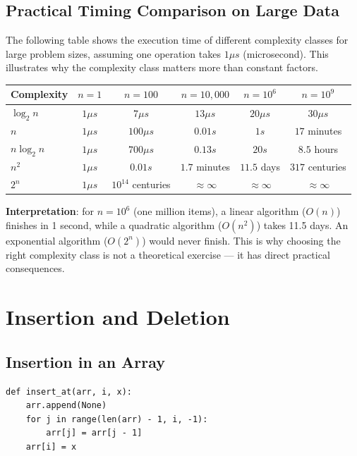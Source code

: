 \documentclass[11pt,a4paper]{article}
\begin{document}
\subsection{Practical Timing Comparison on Large Data}

The following table shows the execution time of different complexity classes for large problem sizes, assuming one operation takes $1 \mu s$ (microsecond). This illustrates why the complexity class matters more than constant factors.

\begin{center}
\begin{tabular}{l|ccccc}
\toprule
Complexity & $n=1$ & $n=100$ & $n=10{,}000$ & $n=10^6$ & $n=10^9$ \\
\midrule
$\log_2 n$ & $1 \mu s$ & $7 \mu s$ & $13 \mu s$ & $20 \mu s$ & $30 \mu s$ \\
$n$ & $1 \mu s$ & $100 \mu s$ & $0.01 s$ & $1 s$ & $17$ minutes \\
$n \log_2 n$ & $1 \mu s$ & $700 \mu s$ & $0.13 s$ & $20 s$ & $8.5$ hours \\
$n^2$ & $1 \mu s$ & $0.01 s$ & $1.7$ minutes & $11.5$ days & $317$ centuries \\
$2^n$ & $1 \mu s$ & $10^{14}$ centuries & $\approx \infty$ & $\approx \infty$ & $\approx \infty$ \\
\bottomrule
\end{tabular}
\end{center}

\textbf{Interpretation}: for $n = 10^6$ (one million items), a linear algorithm ($O(n)$) finishes in 1 second, while a quadratic algorithm ($O(n^2)$) takes 11.5 days. An exponential algorithm ($O(2^n)$) would never finish. This is why choosing the right complexity class is not a theoretical exercise --- it has direct practical consequences.

\section{Insertion and Deletion}

\subsection{Insertion in an Array}

\begin{lstlisting}
def insert_at(arr, i, x):
    arr.append(None)
    for j in range(len(arr) - 1, i, -1):
        arr[j] = arr[j - 1]
    arr[i] = x
\end{lstlisting}
\end{document}
